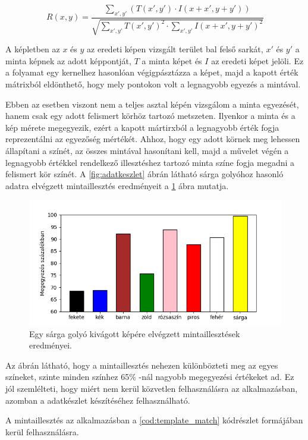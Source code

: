 \begin{equation}
    R(x, y) = \frac{\sum_{x',y'}(T(x',y') \cdot I(x + x', y + y'))}{\sqrt{\sum_{x',y'}T(x',y')^2 \cdot \sum_{x',y'}I(x + x',y + y')^2}}
    \label{for:cross_correlation}
\end{equation}

\par A képletben az $x$ és $y$ az eredeti képen vizsgált terület bal felső sarkát, $x'$ és $y'$ a minta képnek az adott képpontját, $T$ a minta képet és $I$ az eredeti képet jelöli. Ez a folyamat egy kernelhez hasonlóan végigpásztázza a képet, majd a kapott érték mátrixból eldönthető, hogy mely pontokon volt a legnagyobb egyezés a mintával.
\par Ebben az esetben viszont nem a teljes asztal képén vizsgálom a minta egyezését, hanem csak egy adott felismert körhöz tartozó metszeten. Ilyenkor a minta és a kép mérete megegyezik, ezért a kapott mártirxból a legnagyobb érték fogja reprezentálni az egyezőség mértékét. Ahhoz, hogy egy adott körnek meg lehessen állapítani a színét, az összes mintával hasonítani kell, majd a művelet végén a legnagyobb értékkel rendelkező illesztéshez tartozó minta színe fogja megadni a felismert kör színét. A \ref{fig:adatkeszlet} ábrán látható sárga golyóhoz hasonló adatra elvégzett mintaillesztés eredményeit a \ref{fig:mintaillesztes_eredmeny} ábra mutatja.

\begin{figure}[!ht]
    \centering
    \includegraphics[width=140mm, keepaspectratio]{figures/match_values.png}
    \caption{Egy sárga golyó kivágott képére elvégzett mintaillesztések eredményei.}
    \label{fig:mintaillesztes_eredmeny}
\end{figure}

\par Az ábrán látható, hogy a mintaillesztés nehezen különbözteti meg az egyes színeket, szinte minden színhez 65\% -nál nagyobb megegyezési értékeket ad. Ez jól szemlélteti, hogy miért nem kerül közvetlen felhasználásra az alkalmazásban, azomban a adatkészlet készítéséhez felhasználható.
\par A mintaillesztés az alkalmazásban a \ref{cod:template_match} kódrészlet formájában kerül felhasználásra.


